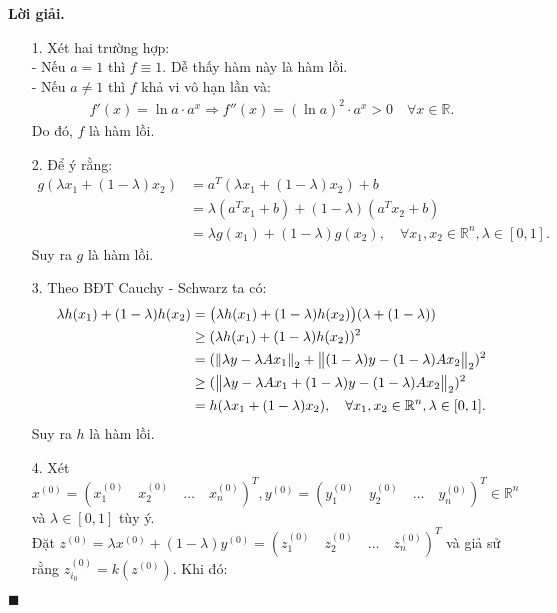 \documentclass[12pt]{article}
\newcommand{\R}{\mathbb{R}}
\newenvironment{solution}{%
     \setlength\parindent{0pt}\par\medskip\textbf{Lời giải.}\quad}{%
     \hfill\tiny$\blacksquare$\par\medskip}
\begin{document}
    \begin{solution}
        \begin{enumerate}
            \item[1.] Xét hai trường hợp:
            \\
            - Nếu $a = 1$ thì $f \equiv 1$. Dễ thấy hàm này là hàm lồi.
            \\
            - Nếu $a \neq 1$ thì $f$ khả vi vô hạn lần và:
            \begin{align*}
                f'(x) = \ln a \cdot a^x \Rightarrow f''(x) = (\ln a)^2 \cdot a^x > 0 \quad \forall x \in \R.
            \end{align*}
            Do đó, $f$ là hàm lồi.
            \item[2.] Để ý rằng:
            \begin{align*}
                g(\lambda x_1 + (1 - \lambda)x_2) &= a^T(\lambda x_1 + (1 - \lambda)x_2) + b\\
                &= \lambda(a^Tx_1 + b) + (1 - \lambda)(a^Tx_2 + b)\\
                &= \lambda g(x_1) + (1 - \lambda)g(x_2), \quad \forall x_1, x_2 \in \R^n, \lambda \in [0, 1].
            \end{align*}
            Suy ra $g$ là hàm lồi.
            \item[3.] Theo BĐT Cauchy - Schwarz ta có:
            \begin{align*}
                \lambda h(x_1) + (1 - \lambda)h(x_2) &= \bigl(\lambda h(x_1) + (1 - \lambda)h(x_2)\bigr) (\lambda + (1 - \lambda))\\
                &\geq (\lambda h(x_1) + (1 - \lambda)h(x_2))^2\\
                &= (\norm{\lambda y - \lambda Ax_1}_2 + \norm{(1 - \lambda)y - (1 - \lambda)Ax_2}_2)^2\\
                &\geq (\norm{\lambda y - \lambda Ax_1 + (1 - \lambda)y - (1 - \lambda)Ax_2}_2)^2\\
                &= h(\lambda x_1 + (1 - \lambda)x_2), \quad \forall x_1, x_2 \in \R^n, \lambda \in [0, 1].
            \end{align*}
            Suy ra $h$ là hàm lồi.
            \item[4.] Xét $x^{(0)} = (x_1^{(0)} \quad x_2^{(0)} \quad \ldots \quad x_n^{(0)})^T, y^{(0)} = (y_1^{(0)} \quad y_2^{(0)} \quad \ldots \quad y_n^{(0)})^T \in \R^n$ và $\lambda \in [0, 1]$ tùy ý.
            \\
            Đặt $z^{(0)} = \lambda x^{(0)} + (1 - \lambda)y^{(0)} = (z_1^{(0)} \quad z_2^{(0)} \quad \ldots \quad z_n^{(0)})^T$ và giả sử rằng $z_{i_0}^{(0)} = k(z^{(0)})$. Khi đó:

\end{enumerate}
\end{solution}
\end{document}
